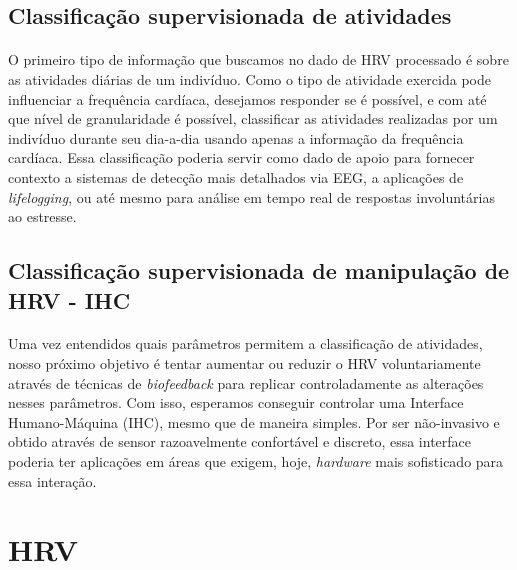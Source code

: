         \subsection{Classificação supervisionada de atividades}
        
            \paragraph{} O primeiro tipo de informação que buscamos no dado de HRV processado é sobre as atividades diárias de um indivíduo. Como o tipo de atividade exercida pode influenciar a frequência cardíaca, desejamos responder se é possível, e com até que nível de granularidade é possível, classificar as atividades realizadas por um indivíduo durante seu dia-a-dia usando apenas a informação da frequência cardíaca. Essa classificação poderia servir como dado de apoio para fornecer contexto a sistemas de detecção mais detalhados via EEG, a aplicações de \textit{lifelogging}, ou até mesmo para análise em tempo real de respostas involuntárias ao estresse.
       
        \subsection{Classificação supervisionada de manipulação de HRV - IHC}
            
            \paragraph{} Uma vez entendidos quais parâmetros permitem a classificação de atividades, nosso próximo objetivo é tentar aumentar ou reduzir o HRV voluntariamente através de técnicas de \textit{biofeedback} para replicar controladamente as alterações nesses parâmetros. Com isso, esperamos conseguir controlar uma Interface Humano-Máquina (IHC), mesmo que de maneira simples. Por ser não-invasivo e obtido através de sensor razoavelmente confortável e discreto, essa interface poderia ter aplicações em áreas que exigem, hoje, \textit{hardware} mais sofisticado para essa interação.



    \section{HRV}
    \label{HRV}
        
